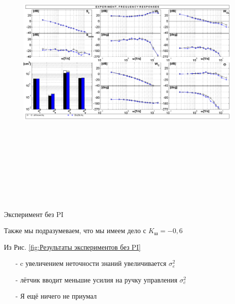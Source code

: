 \begin{figure}[H]
    \centering \includegraphics[width=17cm,height=15cm]{Оглавление/Part3/figures/chast2_20A30B.png}
    \caption{}
    {\label{fig:Частотки второй Системы с изменением А и В}}
    \end{figure}

    \begin{center}
        Эксперимент без PI 
    \end{center}



    Также мы подразумеваем, что мы имеем дело с $K_\text{ш} = -0,6$

    Из Рис. {\ref{fig:Результаты экспериментов без PI}}
    \begin{itemize}
        \item [-] c увеличением неточности знаний увеличивается $\sigma_e^2$
        \item [-] лётчик вводит меньшие усилия на ручку управления $\sigma^2_c$ 
        \item [-]  Я ещё ничего не приумал   
    \end{itemize}